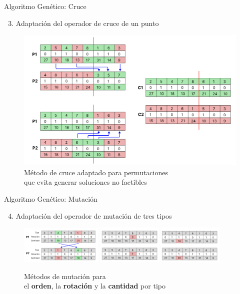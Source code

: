 \documentclass[handout]{beamer}
\begin{document}
\begin{frame}{Algoritmo Genético: Cruce}
    \begin{enumerate}[<+-| alert@+>]
        \setcounter{enumi}{2}
        \item Adaptación del operador de cruce de un punto
    \end{enumerate}
    \begin{figure}
        \centering
        \includegraphics[width=.75\textwidth]{pic/ag-cruce.png}
        \caption*{Método de cruce adaptado para permutaciones\\
            que evita generar soluciones no factibles}
        \label{fig:solucion}
    \end{figure}
\end{frame}

\begin{frame}{Algoritmo Genético: Mutación}
    \begin{enumerate}[<+-| alert@+>]
        \setcounter{enumi}{3}
        \item Adaptación del operador de mutación de tres tipos
    \end{enumerate}
    \vspace{1cm}
    \begin{figure}[H]
        \centering
        \includegraphics[width=0.35\textwidth]{pic/ag-mutacion1.png}
        \includegraphics[width=0.275\textwidth]{pic/ag-mutacion2.png}
        \includegraphics[width=0.275\textwidth]{pic/ag-mutacion3.png}
        \caption*{Métodos de mutación para \\
            el \textbf{orden}, la \textbf{rotación} y la \textbf{cantidad} por tipo}
    \end{figure}
\end{frame}
\end{document}
